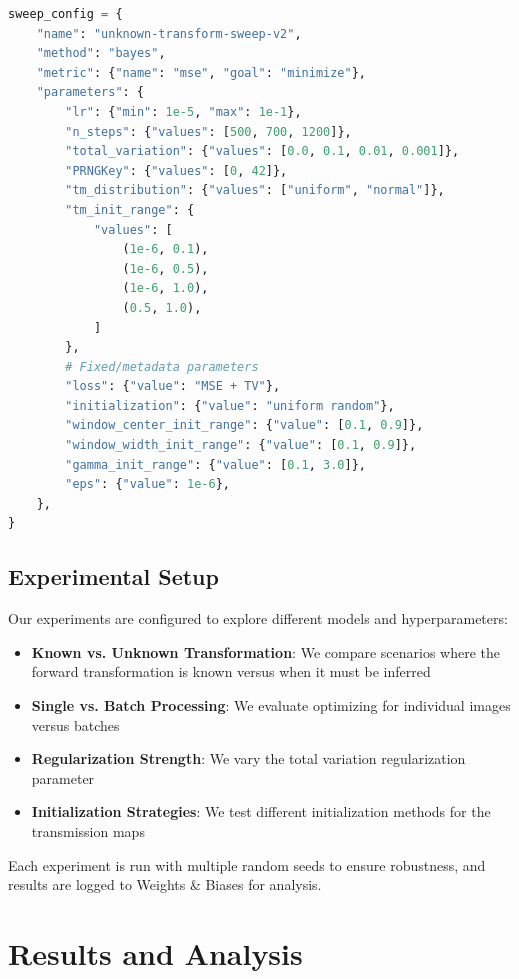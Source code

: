 \documentclass[nomenclature, english, bibtex]{kththesis}
\newcommand*{\sweExpl}[1]{\todo[inline, backgroundcolor=kth-lightblue40]{#1}}  %
\numberwithin{listing}{chapter}
\begin{document}
\begin{lstlisting}[language=Python, caption=Hyperparameter sweep configuration]
sweep_config = {
    "name": "unknown-transform-sweep-v2",
    "method": "bayes",
    "metric": {"name": "mse", "goal": "minimize"},
    "parameters": {
        "lr": {"min": 1e-5, "max": 1e-1},
        "n_steps": {"values": [500, 700, 1200]},
        "total_variation": {"values": [0.0, 0.1, 0.01, 0.001]},
        "PRNGKey": {"values": [0, 42]},
        "tm_distribution": {"values": ["uniform", "normal"]},
        "tm_init_range": {
            "values": [
                (1e-6, 0.1),
                (1e-6, 0.5),
                (1e-6, 1.0),
                (0.5, 1.0),
            ]
        },
        # Fixed/metadata parameters
        "loss": {"value": "MSE + TV"},
        "initialization": {"value": "uniform random"},
        "window_center_init_range": {"value": [0.1, 0.9]},
        "window_width_init_range": {"value": [0.1, 0.9]},
        "gamma_init_range": {"value": [0.1, 3.0]},
        "eps": {"value": 1e-6},
    },
}
\end{lstlisting}

\section{Experimental Setup}
Our experiments are configured to explore different models and hyperparameters:

\begin{itemize}
    \item \textbf{Known vs. Unknown Transformation}: We compare scenarios where the forward transformation is known versus when it must be inferred
    \item \textbf{Single vs. Batch Processing}: We evaluate optimizing for individual images versus batches
    \item \textbf{Regularization Strength}: We vary the total variation regularization parameter
    \item \textbf{Initialization Strategies}: We test different initialization methods for the transmission maps
\end{itemize}

Each experiment is run with multiple random seeds to ensure robustness, and results are logged to Weights \& Biases for analysis.
\chapter{Results and Analysis}
\label{ch:resultsAndAnalysis}
\sweExpl{svensk: Resultat och Analys}
\end{document}
